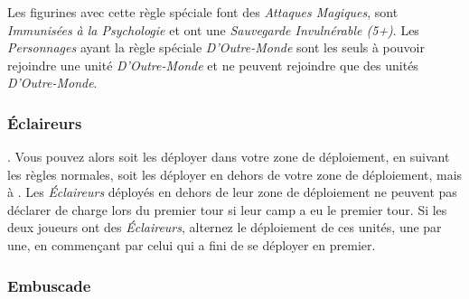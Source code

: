 \subsubsection*{}

Les figurines avec cette règle spéciale font des \emph{Attaques Magiques}, sont \emph{Immunisées à la Psychologie} et ont une \emph{Sauvegarde Invulnérable (5+)}. Les \emph{Personnages} ayant la règle spéciale \emph{D'Outre-Monde} sont les seuls à pouvoir rejoindre une unité \emph{D'Outre-Monde} et ne peuvent rejoindre que des unités \emph{D'Outre-Monde}.

\subsubsection*{Éclaireurs}

. Vous pouvez alors soit les déployer dans votre zone de déploiement, en suivant les règles normales, soit les déployer en dehors de votre zone de déploiement, mais à .  Les \emph{Éclaireurs} déployés en dehors de leur zone de déploiement ne peuvent pas déclarer de charge lors du premier tour si leur camp a eu le premier tour. Si les deux joueurs ont des \emph{Éclaireurs}, alternez le déploiement de ces unités, une par une, en commençant par celui qui a fini de se déployer en premier.

\subsubsection*{Embuscade}

